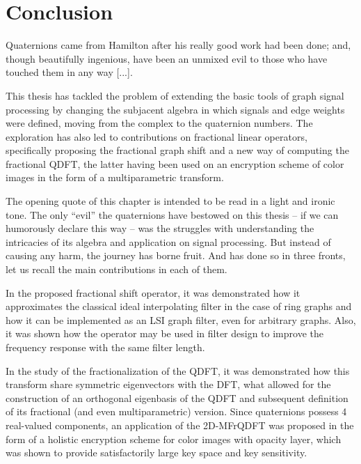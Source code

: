\chapter{Conclusion}
\label{ch:conclusion}

\begin{openingquote}
    Quaternions came from Hamilton after his really good work had been done; and, though beautifully ingenious, have been an unmixed evil to those who have touched them in any way [...].
    \cite[quoting directly Lord Kelvin, in letter to Hatward, 1892]{altmann1989hamilton}
\end{openingquote}

This thesis has tackled the problem of extending the basic tools of graph signal processing by changing the subjacent algebra in which signals and edge weights were defined, moving from the complex to the quaternion numbers. The exploration has also led to contributions on fractional linear operators, specifically proposing the fractional graph shift and a new way of computing the fractional QDFT, the latter having been used on an encryption scheme of color images in the form of a multiparametric transform.

The opening quote of this chapter is intended to be read in a light and ironic tone. The only ``evil'' the quaternions have bestowed on this thesis -- if we can humorously declare this way --  was the struggles with understanding the intricacies of its algebra and application on signal processing. But instead of causing any harm, the journey has borne fruit. And has done so in three fronts, let us recall the main contributions in each of them.

In the proposed fractional shift operator, it was demonstrated how it approximates  the classical ideal interpolating filter in the case of ring graphs and how it can be implemented as an LSI graph filter, even for arbitrary graphs. Also, it was shown how the operator may be used in filter design to improve the frequency response with the same filter length.

In the study of the fractionalization of the QDFT, it was demonstrated how this transform share symmetric eigenvectors with the DFT, what allowed for the construction of an orthogonal eigenbasis of the QDFT and subsequent definition of its fractional (and even multiparametric) version. Since quaternions possess 4 real-valued components, an application of the 2D-MFrQDFT was proposed in the form of a holistic encryption scheme for color images with opacity layer, which was shown to provide satisfactorily large key space and key sensitivity.

